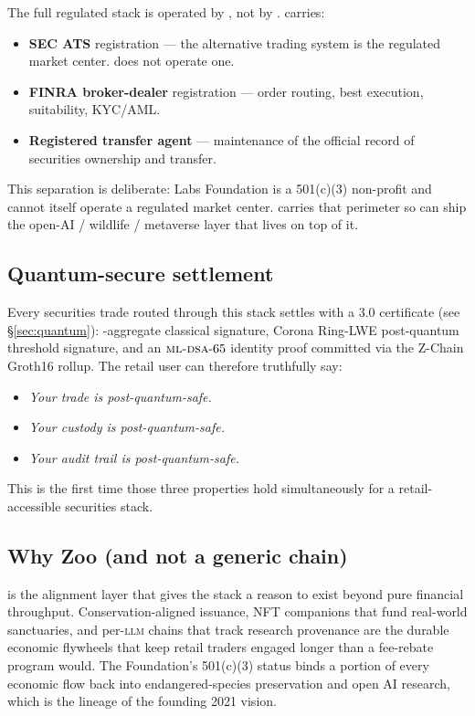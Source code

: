 The full regulated stack is operated by \Partner{}, not by \Zoo{}.
\PartnerCap{} carries:

\begin{itemize}[nosep,leftmargin=1.2em]
\item \textbf{SEC ATS} registration --- the alternative trading system
  is the regulated market center. \Zoo{} does not operate one.
\item \textbf{FINRA broker-dealer} registration --- order routing,
  best execution, suitability, KYC/AML.
\item \textbf{Registered transfer agent} --- maintenance of the
  official record of securities ownership and transfer.
\end{itemize}

This separation is deliberate: \Zoo{} Labs Foundation is a 501(c)(3)
non-profit and cannot itself operate a regulated market center.
\PartnerCap{} carries that perimeter so \Zoo{} can ship the open-AI /
wildlife / metaverse layer that lives on top of it.

\subsection{Quantum-secure settlement}

Every securities trade routed through this stack settles with a
\Quasar{} 3.0 certificate (see \S\ref{sec:quantum}): \BLS{}-aggregate
classical signature, Corona Ring-LWE post-quantum threshold
signature, and an $\textsc{ml-dsa}{}\text{-}65$ identity proof committed via the
Z-Chain Groth16 rollup. The retail user can therefore truthfully say:

\begin{itemize}[nosep,leftmargin=1.2em]
\item \emph{Your trade is post-quantum-safe.}
\item \emph{Your custody is post-quantum-safe.}
\item \emph{Your audit trail is post-quantum-safe.}
\end{itemize}

This is the first time those three properties hold simultaneously for a
retail-accessible securities stack.

\subsection{Why Zoo (and not a generic chain)}

\Zoo{} is the alignment layer that gives the stack a reason to exist
beyond pure financial throughput. Conservation-aligned issuance, NFT
companions that fund real-world sanctuaries, and per-\textsc{llm} chains
that track research provenance are the durable economic flywheels that
keep retail traders engaged longer than a fee-rebate program would. The
\Zoo{} Foundation's 501(c)(3) status binds a portion of every economic
flow back into endangered-species preservation and open AI research,
which is the lineage of the founding 2021 vision.
